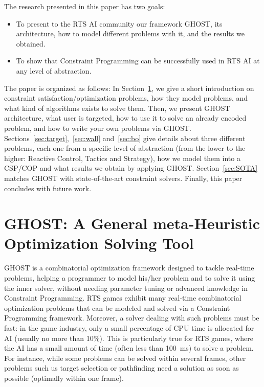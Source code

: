 \documentclass[journal]{IEEEtran}
\newcommand{\minormod}[1]{#1 \xspace}
\newcommand{\csp}{\textsc{CSP}\xspace}
\newcommand{\cop}{\textsc{COP}\xspace}
\newcommand{\ghost}{\textsc{GHOST}\xspace}
\begin{document}
The research presented in this paper has two goals:
\begin{itemize}
\item  To present  to  the RTS  AI community  our  framework \ghost,  its
  architecture,  how  to model  different  problems  with it,  and  the
  results we obtained.
\item To show that Constraint  Programming can be successfully used in
  RTS AI at any level of abstraction.
\end{itemize}

The paper is organized as follows: In Section~\ref{sec:ghost}, we give
a     short     introduction      on     constraint
satisfaction/optimization problems,  how they model problems,  and what
kind  of algorithms  exists to  solve them.   Then, we  present \ghost
architecture, what user is targeted, how  to use it to  solve an already
encoded  problem,  and how  to  write  your  own problems  via  \ghost.
Sections~\ref{sec:target},~\ref{sec:wall}     and~\ref{sec:bo}    give
details about three  different problems, each one from a  specific level of
abstraction (from  the lower to  the higher: Reactive  Control, Tactics
and Strategy), how  we model them into a \csp/\cop  and what results
we obtain by applying  \ghost. Section~\ref{sec:SOTA} matches \ghost
with  state-of-the-art   constraint  solvers.   Finally,   this  paper
concludes with future work.

\section{\ghost:   A  General   meta-Heuristic  Optimization   Solving
  Tool}\label{sec:ghost}

\ghost is a combinatorial  optimization framework designed to tackle real-time problems, helping a programmer to model his/her problem and to solve it using the inner solver, without needing parameter tuning or advanced knowledge in Constraint Programming. RTS games exhibit many real-time combinatorial optimization problems that can be modeled and solved via a Constraint Programming framework. Moreover, a solver dealing with such problems must be fast: in the game industry, only a small percentage of CPU time is allocated for AI (usually no more than 10\%). 
\minormod{This is particularly true for RTS games, where the AI has a small amount of time (often less than 100~ms) to solve a problem. For instance, while some problems can be solved within several frames, other problems such us target selection or pathfinding need a solution as soon as possible (optimally within one frame).}
\end{document}
